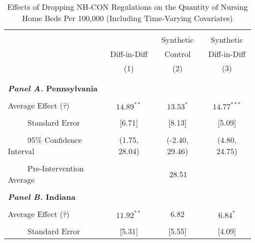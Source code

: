 \documentclass[12pt]{article}
\begin{document}
\vfill
\begin{table}[htbp]\centering \footnotesize
\def\sym#1{\ifmmode^{#1}\else\(^{#1}\)\fi}
\captionsetup{width=.75\textwidth}
\caption{\centering Effects of Dropping NH-CON Regulations on the Quantity of Nursing Home Beds Per 100,000 (Including Time-Varying Covariates)}
\label{tab:ave_results_q_nhb_nobord_cov}
\setlength{\tabcolsep}{10pt}
\begin{tabular}{l*{3}{c}}
\hline\hline
\\[-2ex]
&\multicolumn{1}{c}{}&\multicolumn{1}{c}{Synthetic}&\multicolumn{1}{c}{Synthetic}\\
&\multicolumn{1}{c}{Diff-in-Diff}&\multicolumn{1}{c}{Control}&\multicolumn{1}{c}{Diff-in-Diff}\\
&\multicolumn{1}{c}{(1)}&\multicolumn{1}{c}{(2)}&\multicolumn{1}{c}{(3)}\\
\\[-2ex]
\hline
\\[-.1ex]
\multicolumn{4}{l}{\textbf{\textit{Panel A.} Pennsylvania}}\\
\\[-1.5ex]
\multicolumn{1}{l}{Average Effect ($\hat{\tau}$)}&   \multicolumn{1}{c}{$14.89^{**}$}&   \multicolumn{1}{c}{$13.53^{*}$}&  \multicolumn{1}{c}{$14.77^{***}$}\\
\\[-2ex]
\multicolumn{1}{l}{\ \ \ \ \ Standard Error}  &\multicolumn{1}{c}{[6.71]}&\multicolumn{1}{c}{[8.13]}&\multicolumn{1}{c}{[5.09]}\\
\\[-2ex]
\multicolumn{1}{l}{\ \ \ \ \ 95\% Confidence Interval}&   \multicolumn{1}{c}{(1.75, 28.04)}&   \multicolumn{1}{c}{(-2.40, 29.46)}&   \multicolumn{1}{c}{(4.80, 24.75)}\\
\\[-2ex]
\multicolumn{1}{l}{\ \ \ \ \ Pre-Intervention Average}&   \multicolumn{3}{c}{28.51}\\
\\[-.1ex]
\multicolumn{4}{l}{\textbf{\textit{Panel B.} Indiana}}\\
\\[-1.5ex]
\multicolumn{1}{l}{Average Effect ($\hat{\tau}$)}&   \multicolumn{1}{c}{$11.92^{**}$}&   \multicolumn{1}{c}{6.82}&  \multicolumn{1}{c}{$6.84^{*}$}\\
\\[-2ex]
\multicolumn{1}{l}{\ \ \ \ \ Standard Error}  &\multicolumn{1}{c}{[5.31]}&\multicolumn{1}{c}{[5.55]}&\multicolumn{1}{c}{[4.09]}\\

\end{tabular}
\end{table}
\end{document}

